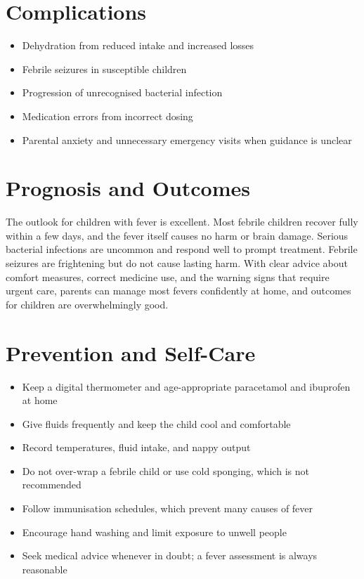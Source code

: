 \section*{Complications}
\begin{itemize}
    \item Dehydration from reduced intake and increased losses
    \item Febrile seizures in susceptible children
    \item Progression of unrecognised bacterial infection
    \item Medication errors from incorrect dosing
    \item Parental anxiety and unnecessary emergency visits when guidance is unclear
\end{itemize}

\section*{Prognosis and Outcomes}
The outlook for children with fever is excellent. Most febrile children recover fully within a few days, and the fever itself causes no harm or brain damage. Serious bacterial infections are uncommon and respond well to prompt treatment. Febrile seizures are frightening but do not cause lasting harm. With clear advice about comfort measures, correct medicine use, and the warning signs that require urgent care, parents can manage most fevers confidently at home, and outcomes for children are overwhelmingly good.

\section*{Prevention and Self-Care}
\begin{itemize}
    \item Keep a digital thermometer and age-appropriate paracetamol and ibuprofen at home
    \item Give fluids frequently and keep the child cool and comfortable
    \item Record temperatures, fluid intake, and nappy output
    \item Do not over-wrap a febrile child or use cold sponging, which is not recommended
    \item Follow immunisation schedules, which prevent many causes of fever
    \item Encourage hand washing and limit exposure to unwell people
    \item Seek medical advice whenever in doubt; a fever assessment is always reasonable
\end{itemize}

